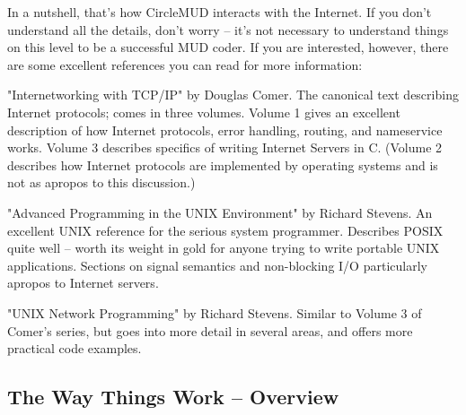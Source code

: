 \documentclass[11pt]{article}
\begin{document}
\par
In a nutshell, that's how CircleMUD interacts with the Internet.  If you don't understand all the details, don't worry -- it's not necessary to understand things on this level to be a successful MUD coder.  If you are interested, however, there are some excellent references you can read for more
information:
\par
"Internetworking with TCP/IP" by Douglas Comer.  The canonical text describing Internet protocols; comes in three volumes.  Volume 1 gives an excellent description of how Internet protocols, error handling, routing, and nameservice works.  Volume 3 describes specifics of writing Internet Servers in C.  (Volume 2 describes how Internet protocols are implemented by operating systems and is not as apropos to this discussion.)
\par
"Advanced Programming in the UNIX Environment" by Richard Stevens.  An excellent UNIX reference for the serious system programmer.  Describes POSIX quite well -- worth its weight in gold for anyone trying to write portable UNIX applications.  Sections on signal semantics and non-blocking I/O particularly apropos to Internet servers.
\par
"UNIX Network Programming" by Richard Stevens.  Similar to Volume 3 of Comer's series, but goes into more detail in several areas, and offers more practical code examples.

\subsection{The Way Things Work -- Overview}
\end{document}
